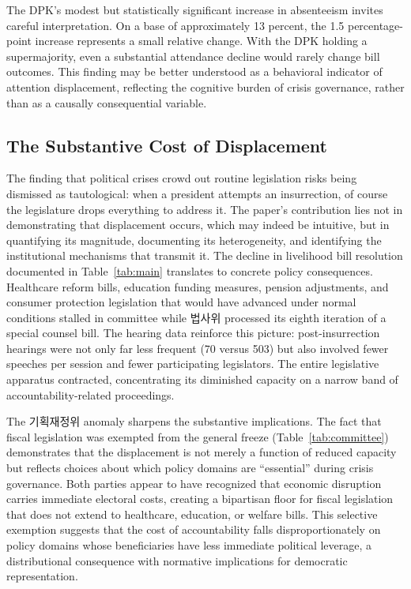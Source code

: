 \documentclass[11pt]{article}
\begin{document}
The DPK's modest but statistically significant increase in absenteeism invites careful interpretation. On a base of approximately 13 percent, the 1.5 percentage-point increase represents a small relative change. With the DPK holding a supermajority, even a substantial attendance decline would rarely change bill outcomes. This finding may be better understood as a behavioral indicator of attention displacement, reflecting the cognitive burden of crisis governance, rather than as a causally consequential variable.

\subsection*{The Substantive Cost of Displacement}

The finding that political crises crowd out routine legislation risks being dismissed as tautological: when a president attempts an insurrection, of course the legislature drops everything to address it. The paper's contribution lies not in demonstrating that displacement occurs, which may indeed be intuitive, but in quantifying its magnitude, documenting its heterogeneity, and identifying the institutional mechanisms that transmit it. The decline in livelihood bill resolution documented in Table~\ref{tab:main} translates to concrete policy consequences. Healthcare reform bills, education funding measures, pension adjustments, and consumer protection legislation that would have advanced under normal conditions stalled in committee while 법사위 processed its eighth iteration of a special counsel bill. The hearing data reinforce this picture: post-insurrection hearings were not only far less frequent (70 versus 503) but also involved fewer speeches per session and fewer participating legislators. The entire legislative apparatus contracted, concentrating its diminished capacity on a narrow band of accountability-related proceedings.

The 기획재정위 anomaly sharpens the substantive implications. The fact that fiscal legislation was exempted from the general freeze (Table~\ref{tab:committee}) demonstrates that the displacement is not merely a function of reduced capacity but reflects choices about which policy domains are ``essential'' during crisis governance. Both parties appear to have recognized that economic disruption carries immediate electoral costs, creating a bipartisan floor for fiscal legislation that does not extend to healthcare, education, or welfare bills. This selective exemption suggests that the cost of accountability falls disproportionately on policy domains whose beneficiaries have less immediate political leverage, a distributional consequence with normative implications for democratic representation.
\end{document}
